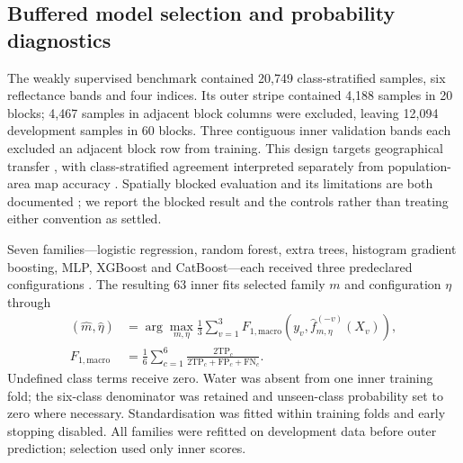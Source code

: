 \documentclass[10pt,a4paper]{article}
\begin{document}
\subsection{Buffered model selection and probability diagnostics}
The weakly supervised benchmark contained 20,749 class-stratified samples, six reflectance bands and four indices. Its outer stripe contained 4,188 samples in 20 blocks; 4,467 samples in adjacent block columns were excluded, leaving 12,094 development samples in 60 blocks. Three contiguous inner validation bands each excluded an adjacent block row from training. This design targets geographical transfer \citep{roberts2017cv,meyer2018target,valavi2019blockcv}, with class-stratified agreement interpreted separately from population-area map accuracy \citep{olofsson2014accuracy,stehman2019accuracy}. Spatially blocked evaluation and its limitations are both documented \citep{ploton2020spatial,wadoux2021spatial}; we report the blocked result and the controls rather than treating either convention as settled.

Seven families---logistic regression, random forest, extra trees, histogram gradient boosting, MLP, XGBoost and CatBoost---each received three predeclared configurations \citep{breiman2001rf,pedregosa2011sklearn,chen2016xgboost,prokhorenkova2018catboost}. The resulting 63 inner fits selected family $m$ and configuration $\eta$ through
\begin{equation}\label{eq:selection}
\begin{aligned}
(\widehat m,\widehat\eta)&=\arg\max_{m,\eta}\frac13\sum_{v=1}^{3}
 F_{1,\mathrm{macro}}(y_v,\widehat f_{m,\eta}^{(-v)}(X_v)),\\
F_{1,\mathrm{macro}}&=\frac16\sum_{c=1}^{6}
 \frac{2\mathrm{TP}_c}{2\mathrm{TP}_c+\mathrm{FP}_c+\mathrm{FN}_c}.
\end{aligned}
\end{equation}
Undefined class terms receive zero. Water was absent from one inner training fold; the six-class denominator was retained and unseen-class probability set to zero where necessary. Standardisation was fitted within training folds and early stopping disabled. All families were refitted on development data before outer prediction; selection used only inner scores.
\end{document}
